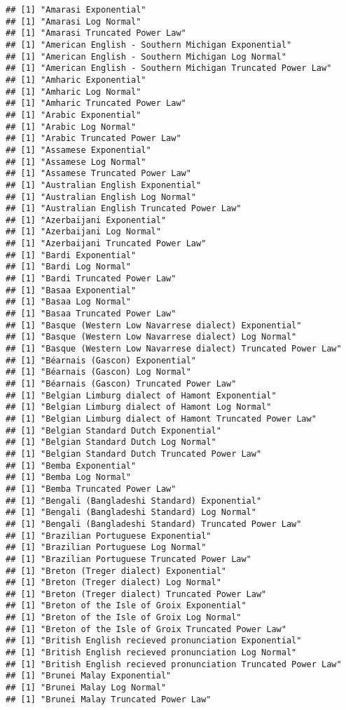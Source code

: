 \documentclass[]{article}
\begin{document}
\begin{verbatim}
## [1] "Amarasi Exponential"
## [1] "Amarasi Log Normal"
## [1] "Amarasi Truncated Power Law"
## [1] "American English - Southern Michigan Exponential"
## [1] "American English - Southern Michigan Log Normal"
## [1] "American English - Southern Michigan Truncated Power Law"
## [1] "Amharic Exponential"
## [1] "Amharic Log Normal"
## [1] "Amharic Truncated Power Law"
## [1] "Arabic Exponential"
## [1] "Arabic Log Normal"
## [1] "Arabic Truncated Power Law"
## [1] "Assamese Exponential"
## [1] "Assamese Log Normal"
## [1] "Assamese Truncated Power Law"
## [1] "Australian English Exponential"
## [1] "Australian English Log Normal"
## [1] "Australian English Truncated Power Law"
## [1] "Azerbaijani Exponential"
## [1] "Azerbaijani Log Normal"
## [1] "Azerbaijani Truncated Power Law"
## [1] "Bardi Exponential"
## [1] "Bardi Log Normal"
## [1] "Bardi Truncated Power Law"
## [1] "Basaa Exponential"
## [1] "Basaa Log Normal"
## [1] "Basaa Truncated Power Law"
## [1] "Basque (Western Low Navarrese dialect) Exponential"
## [1] "Basque (Western Low Navarrese dialect) Log Normal"
## [1] "Basque (Western Low Navarrese dialect) Truncated Power Law"
## [1] "Béarnais (Gascon) Exponential"
## [1] "Béarnais (Gascon) Log Normal"
## [1] "Béarnais (Gascon) Truncated Power Law"
## [1] "Belgian Limburg dialect of Hamont Exponential"
## [1] "Belgian Limburg dialect of Hamont Log Normal"
## [1] "Belgian Limburg dialect of Hamont Truncated Power Law"
## [1] "Belgian Standard Dutch Exponential"
## [1] "Belgian Standard Dutch Log Normal"
## [1] "Belgian Standard Dutch Truncated Power Law"
## [1] "Bemba Exponential"
## [1] "Bemba Log Normal"
## [1] "Bemba Truncated Power Law"
## [1] "Bengali (Bangladeshi Standard) Exponential"
## [1] "Bengali (Bangladeshi Standard) Log Normal"
## [1] "Bengali (Bangladeshi Standard) Truncated Power Law"
## [1] "Brazilian Portuguese Exponential"
## [1] "Brazilian Portuguese Log Normal"
## [1] "Brazilian Portuguese Truncated Power Law"
## [1] "Breton (Treger dialect) Exponential"
## [1] "Breton (Treger dialect) Log Normal"
## [1] "Breton (Treger dialect) Truncated Power Law"
## [1] "Breton of the Isle of Groix Exponential"
## [1] "Breton of the Isle of Groix Log Normal"
## [1] "Breton of the Isle of Groix Truncated Power Law"
## [1] "British English recieved pronunciation Exponential"
## [1] "British English recieved pronunciation Log Normal"
## [1] "British English recieved pronunciation Truncated Power Law"
## [1] "Brunei Malay Exponential"
## [1] "Brunei Malay Log Normal"
## [1] "Brunei Malay Truncated Power Law"

\end{verbatim}
\end{document}
